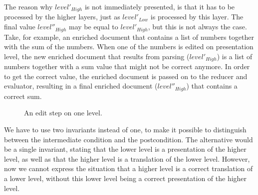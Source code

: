 The reason why $level'_{High}$ is not immediately presented, is that it has to be processed by the higher layers, just as $level'_{Low}$ is processed by this layer. The final value $level''_{High}$ may be equal to $level'_{High}$, but this is not always the case. Take, for example, an enriched document that contains a list of numbers together with the sum of the numbers. When one of the numbers is edited on presentation level, the new enriched document that results from parsing ($level'_{High}$) is a list of numbers together with a sum value that might not be correct anymore. In order to get the correct value, the enriched document is passed on to the reducer and evaluator, resulting in a final enriched document ($level''_{High}$) that contains a correct sum.

\begin{figure}
\begin{small}
\begin{center}
\begin{center}
\end{center}\caption{An edit step on one level.}\label{layerEditProcess} 
\end{center}
\end{small}
\end{figure}

We have to use two invariants instead of one, to make it possible to distinguish between the intermediate condition and the postcondition. The alternative would be a single invariant, stating that the lower level is a presentation of the higher level, as well as that the higher level is a translation of the lower level. However, now we cannot express the situation that a higher level is a correct translation of a lower level, without this lower level being a correct presentation of the higher level.

